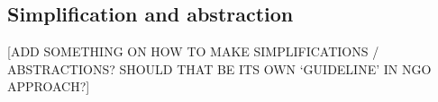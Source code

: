 \subsection{Simplification and abstraction}

  [ADD SOMETHING ON HOW TO MAKE SIMPLIFICATIONS / ABSTRACTIONS? SHOULD THAT BE ITS OWN `GUIDELINE’ IN NGO APPROACH?]
  